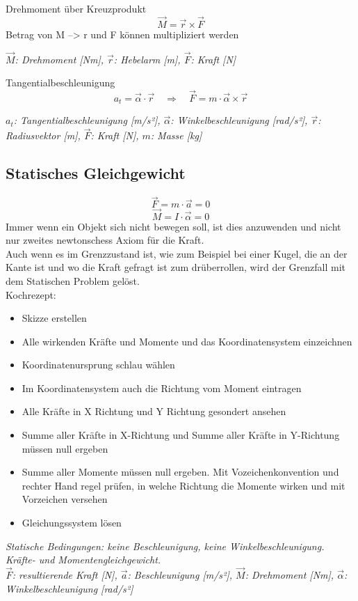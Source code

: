 \documentclass[a4paper,10pt]{article}
\newenvironment{displayformula}
{
	\begin{framed}
		\color{formulaColor}
	}
	{\end{framed}}
\newcommand{\formulalegend}[1]{%
	\par\vspace{0.5ex}%
	{{\color{legendColor}\RaggedRight\small\textit{#1}}}%
	\par\vspace{1.5ex}%
}
\begin{document}
\begin{displayformula}
	Drehmoment über Kreuzprodukt
	\[
	\vec{M} = \vec{r} \times \vec{F}
	\]
	Betrag von M --> r und F können multipliziert werden
\end{displayformula}
\formulalegend{
	\( \vec{M} \): Drehmoment [Nm], \( \vec{r} \): Hebelarm [m], \( \vec{F} \): Kraft [N]
}

\begin{displayformula}
	Tangentialbeschleunigung
	\[
	a_t = \vec{\alpha} \cdot \vec{r} \quad \Rightarrow \quad \vec{F} = m \cdot \vec{\alpha} \times \vec{r}
	\]
\end{displayformula}
\formulalegend{
	\( a_t \): Tangentialbeschleunigung [m/s²], \( \vec{\alpha} \): Winkelbeschleunigung [rad/s²], \( \vec{r} \): Radiusvektor [m], \( \vec{F} \): Kraft [N], \( m \): Masse [kg]
}

\subsection{Statisches Gleichgewicht}

\begin{displayformula}
	\[
	\vec{F} = m \cdot \vec{a} = 0
	\]
	\[
	\vec{M} = I \cdot \vec{\alpha} = 0
	\]
	Immer wenn ein Objekt sich nicht bewegen soll, ist dies anzuwenden und nicht nur zweites newtonschess Axiom für die Kraft. \\ Auch wenn es im Grenzzustand ist, wie zum Beispiel bei einer Kugel, die an der Kante ist und wo die Kraft gefragt ist zum drüberrollen, wird der Grenzfall mit dem Statischen Problem gelöst. \\ Kochrezept:
	\begin{itemize}
		\item Skizze erstellen
		\item Alle wirkenden Kräfte und Momente und das Koordinatensystem einzeichnen
		\item Koordinatenursprung schlau wählen
		\item Im Koordinatensystem auch die Richtung vom Moment eintragen
		\item Alle Kräfte in X Richtung und Y Richtung gesondert ansehen
		\item Summe aller Kräfte in X-Richtung und Summe aller Kräfte in Y-Richtung müssen null ergeben
		\item Summe aller Momente müssen null ergeben. Mit Vozeichenkonvention und rechter Hand regel prüfen, in welche Richtung die Momente wirken und mit Vorzeichen versehen
		\item Gleichungssystem lösen
	\end{itemize}
\end{displayformula}
\formulalegend{
	Statische Bedingungen: keine Beschleunigung, keine Winkelbeschleunigung. Kräfte- und Momentengleichgewicht.\\
	\( \vec{F} \): resultierende Kraft [N], \( \vec{a} \): Beschleunigung [m/s²], \( \vec{M} \): Drehmoment [Nm], \( \vec{\alpha} \): Winkelbeschleunigung [rad/s²]
}
\newpage
\end{document}
